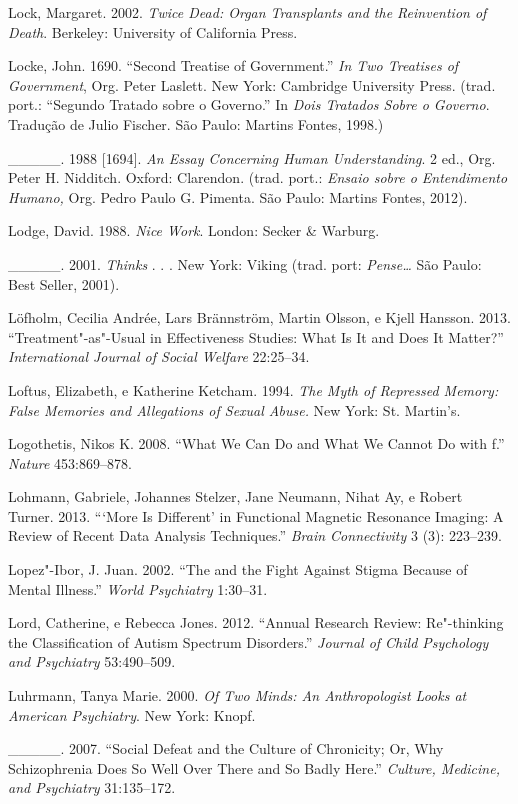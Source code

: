 {\begin{Parskip}
Lock, Margaret. 2002. \emph{Twice Dead: Organ Transplants and the
Reinvention of Death}. Berkeley: University of California Press.

Locke, John. 1690. ``Second Treatise of Government.'' \emph{In Two
Treatises of Government}, Org. Peter Laslett. New York: Cambridge
University Press. (trad. port.: ``Segundo Tratado sobre o Governo.'' In
\emph{Dois Tratados Sobre o Governo}. Tradução de Julio Fischer. São
Paulo: Martins Fontes, 1998.)

\_\_\_\_\_. 1988 {[}1694{]}. \emph{An Essay Concerning Human
Understanding}. 2 ed., Org. Peter H. Nidditch. Oxford: Clarendon. (trad.
port.: \emph{Ensaio sobre o Entendimento Humano,} Org. Pedro Paulo G.
Pimenta. São Paulo: Martins Fontes, 2012).

Lodge, David. 1988. \emph{Nice Work}. London: Secker \& Warburg.

\_\_\_\_\_. 2001. \emph{Thinks} . . . New York: Viking (trad. port:
\emph{Pense\ldots{}} São Paulo: Best Seller, 2001).

Löfholm, Cecilia Andrée, Lars Brännström, Martin Olsson, e Kjell
Hansson. 2013. ``Treatment"-as"-Usual in Effectiveness Studies: What Is It
and Does It Matter?'' \emph{International Journal of Social Welfare}
22:25--34.

Loftus, Elizabeth, e Katherine Ketcham. 1994. \emph{The Myth of
Repressed Memory: False Memories and Allegations of Sexual Abuse.} New
York: St. Martin's.

Logothetis, Nikos K. 2008. ``What We Can Do and What We Cannot Do with
f.'' \emph{Nature} 453:869--878.

Lohmann, Gabriele, Johannes Stelzer, Jane Neumann, Nihat Ay, e Robert
Turner. 2013. ```More Is Different' in Functional Magnetic Resonance
Imaging: A Review of Recent Data Analysis Techniques.'' \emph{Brain
Connectivity} 3 (3): 223--239.

Lopez"-Ibor, J. Juan. 2002. ``The  and the Fight Against Stigma
Because of Mental Illness.'' \emph{World Psychiatry} 1:30--31.

Lord, Catherine, e Rebecca Jones. 2012. ``Annual Research Review:
Re"-thinking the Classification of Autism Spectrum Disorders.''
\emph{Journal of Child Psychology and Psychiatry} 53:490--509.

Luhrmann, Tanya Marie. 2000. \emph{Of Two Minds: An Anthropologist Looks
at American Psychiatry}. New York: Knopf.

\_\_\_\_\_. 2007. ``Social Defeat and the Culture of Chronicity; Or, Why
Schizophrenia Does So Well Over There and So Badly Here.''
\emph{Culture, Medicine, and Psychiatry} 31:135--172.


\end{Parskip}}
